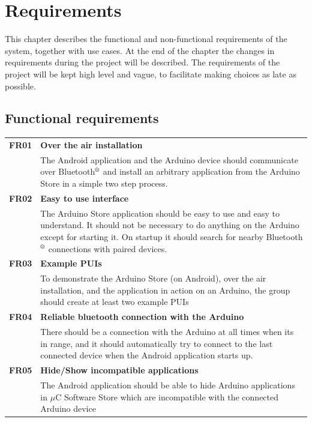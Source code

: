 \chapter{Requirements}
This chapter describes the functional and non-functional requirements of the system, together with use cases. At the end of the chapter the changes in requirements during the project will be described.
The requirements of the project will be kept high level and vague, to facilitate making choices as late as possible.

\section{Functional requirements}
	\begin{table}[H]
	\begin{tabularx}{\linewidth}{lX}

		\textbf{FR01} & \textbf{Over the air installation}\\
 		              & The Android application and the Arduino device should communicate over 
                        Bluetooth$\textsuperscript{\textregistered}$  and install an arbitrary application from the Arduino Store in a simple two step process.\\

		\textbf{FR02} & \textbf{Easy to use interface}\\
                      & The Arduino Store application should be easy to use and easy to understand. It should not be necessary to do anything on the Arduino except for starting it. On startup it should search for nearby Bluetooth$\textsuperscript{\textregistered}$  connections with paired devices.\\

 		\textbf{FR03} & \textbf{Example PUIs}\\
                      & To demonstrate the Arduino Store (on Android), over the air installation, and the application in action on an Arduino, the group should create at least two example PUIs \\

		\textbf{FR04} & \textbf{Reliable bluetooth connection with the Arduino}\\
                      & There should be a connection with the Arduino at all times when its in range, and it should automatically try to connect to the last connected device when the Android application starts up.\\

        \textbf{FR05} & \textbf{Hide/Show incompatible applications}\\
                      & The Android application should be able to hide Arduino applications in $\mu$C Software Store which are incompatible with the connected Arduino device\\


\end{tabularx}
\end{table}
